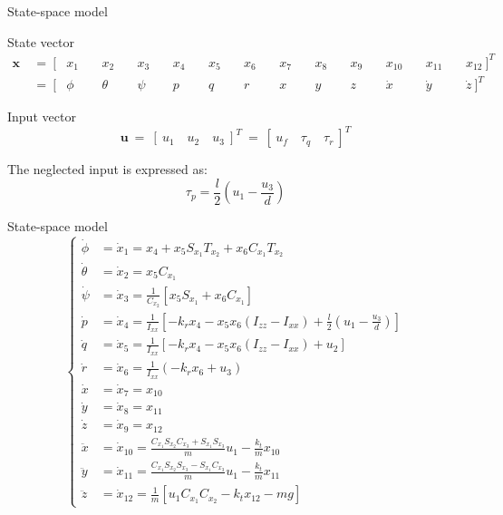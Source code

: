 \begin{frame}{State-space model}
	
	\begin{block}{State vector}
		\begin{align*}
		\mathbf{x} \ &= \ [&x_1 &\ &x_2 &\ &x_3 &\ &x_4 &\ &x_5 &\ &x_6 &\ &x_7 &\ &x_8 &\ &x_9 &\ &x_{10} &\ &x_{11} &\ &x_{12} \ ]^T \\
		&= \ [&\phi &\ &\theta &\ &\psi &\ &p &\ &q &\ &r &\ &x &\ &y &\ &z &\ &\dot{x} &\ &\dot{y} &\ &\dot{z} \ ]^T
		\end{align*}
	\end{block}
	\begin{block}{Input vector}
		\begin{equation}
		\mathbf{u} \ = \ [ \ u_1 \quad u_2 \quad u_3 \ ]^T \ = \ [ \ u_f \quad \tau_q \quad \tau_r \ ]^T
		\end{equation}
	\end{block}
	
	The neglected input is expressed as:
	\begin{equation}
		\tau_p = \dfrac{l}{2}(u_1- \dfrac{u_3}{d})
	\end{equation}

\end{frame}

\begin{frame}{State-space model}
	\begin{equation}
		\begin{cases}
		\dot{\phi} & = \dot{x}_1 = x_4 + x_5 S_{x_1} T_{x_2} + x_6 C_{x_1} T_{x_2} \\
		\dot{\theta} & = \dot{x}_2 = x_5 C_{x_1} \\
		\dot{\psi} & =  \dot{x}_3 = \frac{1}{C_{x_2}} [ x_5 S_{x_1} + x_6 C_{x_1}] \\
		\dot{p} & = \dot{x}_4 = \frac{1}{I_{xx}}[-k_r x_4 - x_5 x_6 (I_{zz} - I_{xx}) + \frac{l}{2} (u_1 -\frac{u_3}{d})] \\
		\dot{q} & = \dot{x}_5 = \frac{1}{I_{xx}}[-k_r x_4 - x_5 x_6 (I_{zz} - I_{xx}) + u_2]\\
		\dot{r} & = \dot{x}_6 = \frac{1}{I_{xx}}(-k_r x_6 + u_3) \\
		\dot{x} & = \dot{x}_7 = x_{10} \\
		\dot{y} & = \dot{x}_8 = x_{11} \\
		\dot{z} & = \dot{x}_9 = x_{12} \\
		\ddot{x} & = \dot{x}_{10} = \frac{C_{x_1} S_{x_2} C_{x_3} + S_{x_1} S_{x_3}}{m} u_1 - \frac{k_t}{m}x_{10} \\
		\ddot{y} & = \dot{x}_{11} = \frac{C_{x_1} S_{x_2} S_{x_3} - S_{x_1} C_{x_3}}{m} u_1 - \frac{k_t}{m}x_{11} \\
		\ddot{z} & = \dot{x}_{12} = \frac{1}{m} [u_1 C_{x_1} C_{x_2} - k_t x_{12} - m g]
		\end{cases}
		\label{completeQuadModel}
	\end{equation}
\end{frame}

